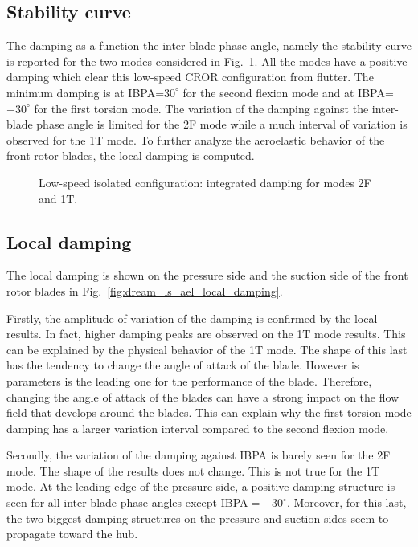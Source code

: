 
\subsection{Stability curve}
\label{sub:dream_ls_ael_curve}

The damping as a function the inter-blade phase angle, namely the stability
curve is reported for the two modes considered in Fig.~\ref{fig:dream_ls_ael_damping}.
All the modes have a positive damping which clear this low-speed CROR configuration
from flutter. The minimum damping is at IBPA=$30^\circ$ for the second flexion
mode and at IBPA=$-30^\circ$ for the first torsion mode.
The variation of the damping against the inter-blade phase angle is
limited for the 2F mode while a much interval of variation is
observed for the 1T mode. To further analyze the aeroelastic behavior
of the front rotor blades, the local damping is computed.
\begin{figure}[htp]
  \centering
  \caption{Low-speed isolated configuration: integrated damping for modes 2F and 1T.}
  \label{fig:dream_ls_ael_damping}
\end{figure}

\subsection{Local damping}
\label{sub:dream_ls_ael_local_damping}

The local damping is shown on the pressure side and
the suction side of the front rotor blades in 
Fig.~\ref{fig:dream_ls_ael_local_damping}.

Firstly, the amplitude of variation of the damping
is confirmed by the local results. In fact, higher damping peaks
are observed on the 1T mode results. This can be explained
by the physical behavior of the 1T mode. The shape of this last
has the tendency to change the angle of attack of the blade.
However is parameters is the leading one for the
performance of the blade. Therefore, changing the angle of attack
of the blades can have a strong impact on the flow field
that develops around the blades. This can explain why the
first torsion mode damping has a larger variation interval
compared to the second flexion mode.

Secondly, the variation of the damping against IBPA
is barely seen for the 2F mode. The shape of the
results does not change. This is not true for the
1T mode. At the leading edge of the pressure side,
a positive damping structure is seen for all inter-blade phase
angles except
\mbox{IBPA$=-30^\circ$}. Moreover, for this last, 
the two biggest damping structures on the pressure 
and suction sides seem to propagate toward the hub.

